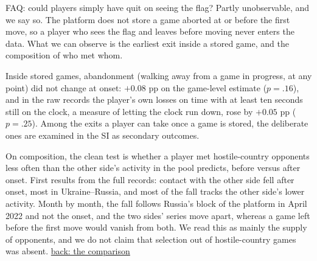 \documentclass[aspectratio=169,11pt,t]{beamer}
\newcommand{\backto}[2]{\vfill\hfill\hyperlink{#1}{\textcolor{linkblue}{\scriptsize\textsf{back: #2}}}}
\begin{document}
\begin{frame}[label=faq-quit]{FAQ: could players simply have quit on seeing the flag?}
  \footnotesize
  Partly unobservable, and we say so. The platform does not store a game aborted at or before the first move, so a player who sees the flag and leaves before moving never enters the data. What we can observe is the earliest exit inside a stored game, and the composition of who met whom.

  Inside stored games, abandonment (walking away from a game in progress, at any point) did not change at onset: $+0.08$ pp on the game-level estimate ($p = .16$), and in the raw records the player's own losses on time with at least ten seconds still on the clock, a measure of letting the clock run down, rose by $+0.05$ pp ($p = .25$). Among the exits a player can take once a game is stored, the deliberate ones are examined in the SI as secondary outcomes.

  On composition, the clean test is whether a player met hostile-country opponents less often than the other side's activity in the pool predicts, before versus after onset. First results from the full records: contact with the other side fell after onset, most in Ukraine--Russia, and most of the fall tracks the other side's lower activity. Month by month, the fall follows Russia's block of the platform in April 2022 and not the onset, and the two sides' series move apart, whereas a game left before the first move would vanish from both. We read this as mainly the supply of opponents, and we do not claim that selection out of hostile-country games was absent.
  \backto{comparison}{the comparison}
\end{frame}
\end{document}
